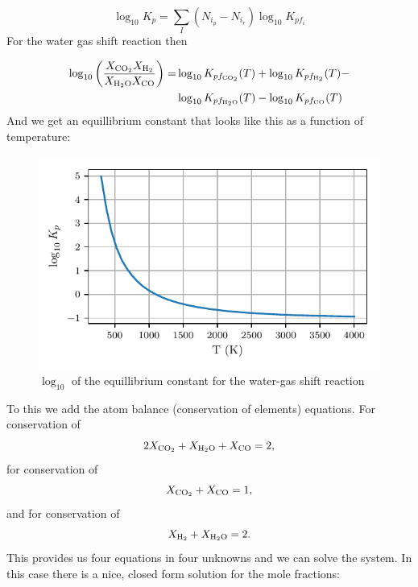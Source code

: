 \documentclass[twocolumn]{memoir} %
\begin{document}
\begin{equation}
    \log_{10}K_p = \sum\limits_I(N_{i_p} - N_{i_r})\log_{10}K_{pf_i}
\end{equation}
%
For the water gas shift reaction then

\begin{equation}
    \begin{split}
        \log_{10} \left(\frac{X_{\ce{CO2}}X_{\ce{H2}}}{X_{\ce{H2O}}X_{\ce{CO}}}\right) = 
        &\log_{10}K_{pf_{\ce{CO2}}}(T) + \log_{10}K_{pf_{\ce{H2}}}(T) - \\
        &\log_{10}K_{pf_{\ce{H2O}}}(T) - \log_{10}K_{pf_{\ce{CO}}}(T)
    \end{split}
\end{equation}
%
And we get an equillibrium constant that looks like this as a function of temperature:
\begin{figure}[H]
    \includegraphics[width=\columnwidth]{wgs_Kp}
    \caption{$\log_{10}$ of the equillibrium constant for the water-gas shift reaction}
\end{figure}

To this we add the atom balance (conservation of elements) equations.  For conservation of 
\begin{equation}
    2X_{\ce{CO2}} + X_{\ce{H2O}} + X_{\ce{CO}} = 2,
\end{equation}
%
for conservation of 
\begin{equation}
    X_{\ce{CO2}} + X_{\ce{CO}} = 1,
\end{equation}
%
and for conservation of 
\begin{equation}
    X_{\ce{H2}} + X_{\ce{H2O}} = 2.
\end{equation}
%
This provides us four equations in four unknowns and we can solve the system.  In this case there is
a nice, closed form solution for the mole fractions:
\end{document}

